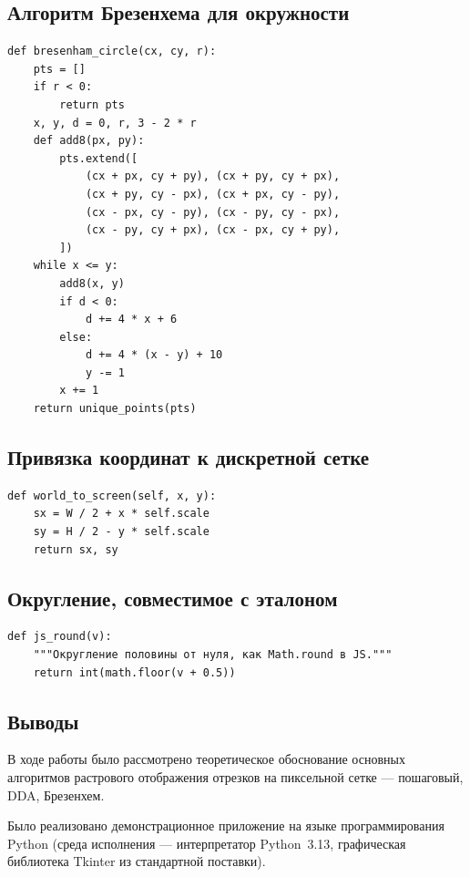 \documentclass[a4paper,14pt]{extarticle}
\begin{document}
\subsection{Алгоритм Брезенхема для окружности}
\begin{lstlisting}[caption={bresenham\_circle(cx, cy, r)}]
def bresenham_circle(cx, cy, r):
    pts = []
    if r < 0:
        return pts
    x, y, d = 0, r, 3 - 2 * r
    def add8(px, py):
        pts.extend([
            (cx + px, cy + py), (cx + py, cy + px),
            (cx + py, cy - px), (cx + px, cy - py),
            (cx - px, cy - py), (cx - py, cy - px),
            (cx - py, cy + px), (cx - px, cy + py),
        ])
    while x <= y:
        add8(x, y)
        if d < 0:
            d += 4 * x + 6
        else:
            d += 4 * (x - y) + 10
            y -= 1
        x += 1
    return unique_points(pts)
\end{lstlisting}

\subsection{Привязка координат к дискретной сетке}
\begin{lstlisting}[caption={world\_to\_screen(x, y)}]
def world_to_screen(self, x, y):
    sx = W / 2 + x * self.scale
    sy = H / 2 - y * self.scale
    return sx, sy
\end{lstlisting}

\subsection{Округление, совместимое с эталоном}
\begin{lstlisting}[caption={js\_round(v) — аналог Math.round}]
def js_round(v):
    """Округление половины от нуля, как Math.round в JS."""
    return int(math.floor(v + 0.5))
\end{lstlisting}

\subsection{Выводы}
В ходе работы было рассмотрено теоретическое обоснование основных алгоритмов растрового отображения отрезков на пиксельной сетке — пошаговый, DDA, Брезенхем.

Было реализовано демонстрационное приложение на языке программирования Python (среда исполнения — интерпретатор Python~3.13, графическая библиотека Tkinter из стандартной поставки).
\end{document}
